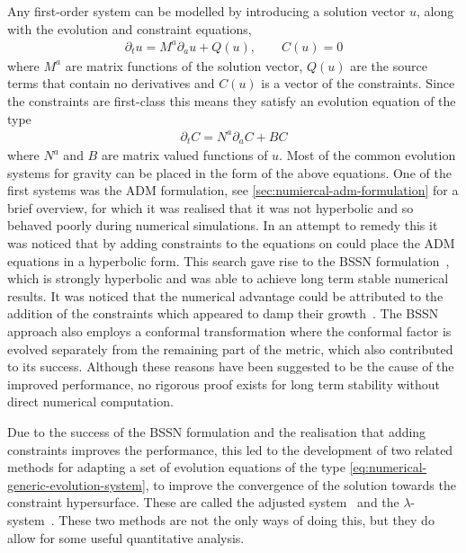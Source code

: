 \documentclass[10pt]{report}
\theoremstyle{definition}
\begin{document}
Any first-order system can be modelled by introducing a solution vector $u$, along with the evolution and constraint equations,
\begin{align} \label{eq:numerical-generic-evolution-system}
    \partial_t u = M^a \partial_a u + Q(u), \qquad C(u) = 0 
\end{align}
where $M^a$ are matrix functions of the solution vector, $Q(u)$ are the source terms that contain no derivatives and $C(u)$ is a vector of the constraints. Since the constraints are first-class this means they satisfy an evolution equation of the type 
\begin{align} \label{eq:numerical-generaic-constraint-system}
    \partial_t C = N^a \partial_a C + B C 
\end{align}
where $N^a$ and $B$ are matrix valued functions of $u$. Most of the common evolution systems for gravity can be placed in the form of the above equations. One of the first systems was the ADM formulation, see \cref{sec:numiercal-adm-formulation} for a brief overview, for which it was realised that it was not hyperbolic and so behaved poorly during numerical simulations. In an attempt to remedy this it was noticed that by adding constraints to the equations on could place the ADM equations in a hyperbolic form. This search gave rise to the BSSN formulation~\cite{On_the_Numerica_Baumga_1998}, which is strongly hyperbolic and was able to achieve long term stable numerical results. It was noticed that the numerical advantage could be attributed to the addition of the constraints which appeared to damp their growth~\cite{Formulations_of_Shinka_2008}. The BSSN approach also employs a conformal transformation where the conformal factor is evolved separately from the remaining part of the metric, which also contributed to its success. Although these reasons have been suggested to be the cause of the improved performance, no rigorous proof exists for long term stability without direct numerical computation.

Due to the success of the BSSN formulation and the realisation that adding constraints improves the performance, this led to the development of two related methods for adapting a set of evolution equations of the type \cref{eq:numerical-generic-evolution-system}, to improve the convergence of the solution towards the constraint hypersurface. These are called the adjusted system~\cite{Hyperbolic_form_Yoneda_2001} and the $\lambda$-system~\cite{Einstein_s_Equa_Brodbe_1998}. These two methods are not the only ways of doing this, but they do allow for some useful quantitative analysis.
\end{document}
